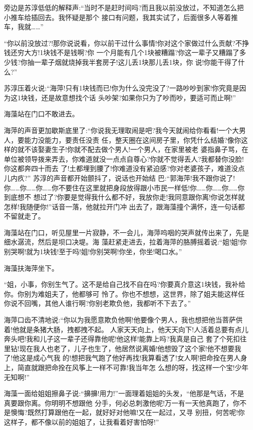 \documentclass[11pt,a4paper,onecolumn]{article}
\begin{document}
旁边是苏淳低低的解释声:``当时不是赶时间吗?而且我以前没放过，不知道怎么把小推车给插回去。我怀疑是那个
接口有问题，我其实试了，后面很多人等着推车，我就……''

``你以前没放过?!那你说说看，你以前干过什么事情!你对这个家做过什么贡献?不挣钱还穷大方!1块钱不是钱啊?你
一个月能有几个1块被糟蹋?你这一辈子又糟蹋了多少钱?你抽一辈子烟就烧掉我半套房子!这儿丢1块那儿丢1块，你
说!你能干得了什么?''

苏淳压着火说:``海萍!只有1块钱而已!你为什么没完没了?一路吵吵到家!你究竟是因为这1块钱，还是故意想找个话
头吵架?如果你只为了吵而吵，要适可而止啊!''

海藻站在门口不敢进去。

海萍的声音更加歇斯底里了:``你说我无理取闹是吧?我今天就闹给你看看!一个大男人，要能力没能力，要责任没责
任，整天圈在这间房子里，你凭什么结婚?像你这样的就不该娶妻生子!你就不配去做个男人!一个男人，在家里被老
婆指鼻子骂，在单位被领导拨来弄去，你难道就没一点点自尊心?你就不觉得丢人?我都替你没脸!你这都奔四十而去
了!土都埋到腰了!你难道没有紧迫感?你对老婆孩子，难道没点儿内疚?'' 苏淳的声音都开始颤抖了，说话也开始结
巴:``郭海萍!我不跟你说了!你……你……你……你不要住在这里就把身段放得跟小市民一样低!你……你……你……你到底想不
想过了?你要是觉得我什么都不好，我放你走!我同意跟你离!你说怎样就怎样!我随便你!''话音一落，他就拉开门冲
出去了，跟海藻撞个满怀，连一句话都不留就走了。

海藻站在门口，听见屋里一片寂静，不一会儿，海萍呜咽的哭声就传出来了，先是细水潺流，然后是坝口决堤。海
藻赶紧走进去，拉着海萍的胳膊摇着说:``姐!姐!你别哭啊!就为1块钱!至于吗!姐!你别哭啊!你坐，你坐!喝口水。''

海藻扶海萍坐下。

``姐，小事，你别生气了。这不是给自己找不自在吗?你要真介意这1块钱，我补给你。你别为难姐夫了，他都够可
怜了。你也不想想，这世界，除了姐夫能这样任你说不回嘴，其他人谁行啊?你别老欺负他，我都听不下去了。''

海萍口齿不清地说:``你以为我愿意欺负他啊!他要像个男人，我也想把他当菩萨供着!他就是条猪大肠，拽都拽不起。
人家天天向上，他天天向下!人活着总要有点儿奔头吧!我和儿子这一辈子还得靠他呢!他这样!能靠上吗?我真是自己
套了个死扣往里钻!现在我人也老了，儿子也生了，他居然说离婚!他想毁了这个家!他不想要我了!他这是成心气我
的!想把我气跑了他好再找!我算看透了!女人啊!把命拴在男人身上，简直就跟把命拴在风筝上一样不可靠!我当年怎
么想的呀，找这样一个宝!少年无知啊!''

海藻一面给姐姐擦鼻子说:``擤擤!用力!''一面理着姐姐的头发，``他那是气话，不是真要跟你离。你明明不想跟他
分手，何必总刺激他呢!万一有一天他真跑了，你不是懊悔?既然打算跟他在一起，就好好对他嘛!又在一起过，又寻
别扭，何苦呢!你这样子，都不像以前的姐姐了，让我看着好害怕呀!''
\end{document}

